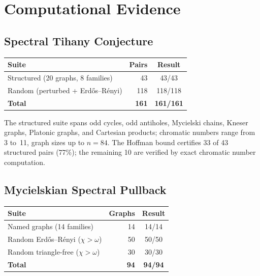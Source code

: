 \documentclass[11pt]{amsart}
\theoremstyle{definition}
\theoremstyle{remark}
\begin{document}
\section{Computational Evidence}\label{sec:evidence}

\subsection{Spectral Tihany Conjecture}

\begin{center}
\begin{tabular}{lrc}
\toprule
Suite & Pairs & Result \\
\midrule
Structured (20 graphs, 8 families) & 43 & 43/43 \\
Random (perturbed + Erd\H{o}s--R\'enyi) & 118 & 118/118 \\
\midrule
\textbf{Total} & \textbf{161} & \textbf{161/161} \\
\bottomrule
\end{tabular}
\end{center}

The structured suite spans odd cycles, odd antiholes, Mycielski chains, 
Kneser graphs, Platonic graphs, and Cartesian products; 
chromatic numbers range from 3 to~11, graph sizes up to $n = 84$.  
The Hoffman bound certifies 33 of 43 structured pairs (77\%); the 
remaining 10 are verified by exact chromatic number computation.

\subsection{Mycielskian Spectral Pullback}

\begin{center}
\begin{tabular}{lrc}
\toprule
Suite & Graphs & Result \\
\midrule
Named graphs (14 families) & 14 & 14/14 \\
Random Erd\H{o}s--R\'enyi ($\chi > \omega$) & 50 & 50/50 \\
Random triangle-free ($\chi > \omega$) & 30 & 30/30 \\
\midrule
\textbf{Total} & \textbf{94} & \textbf{94/94} \\
\bottomrule
\end{tabular}
\end{center}
\end{document}
